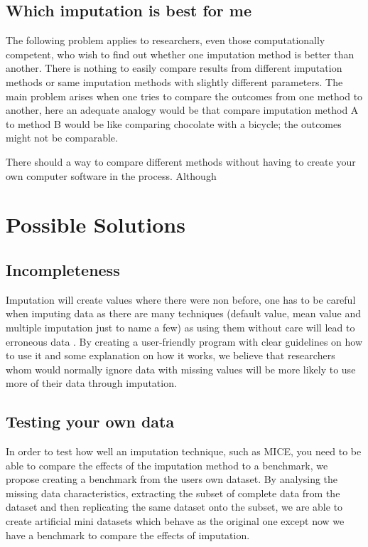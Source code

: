 \documentclass{IEEEconf}
\begin{document}
		\subsection{Which imputation is best for me} %
		\label{sub:which_imputation_is_best_for_me}
			The following problem applies to researchers, even those computationally competent, who wish to find out whether one imputation method is better than another. There is nothing to easily compare results from different imputation methods or same imputation methods with slightly different parameters. The main problem arises when one tries to compare the outcomes from one method to another, here an adequate analogy would be that compare imputation method A to method B would be like comparing chocolate with a bicycle; the outcomes might not be comparable. 

			There should a way to compare different methods without having to create your own computer software in the process. Although 

	\section{Possible Solutions} %
	\label{sec:a_solution}
		\subsection{Incompleteness} %
		\label{sub:incompleteness}
			Imputation will create values where there were non before, one has to be careful when imputing data as there are many techniques (default value, mean value and multiple imputation just to name a few) as using them without care will lead to erroneous data \cite{careful}. By creating a user-friendly program with clear guidelines on how to use it and some explanation on how it works, we believe that researchers whom would normally ignore data with missing values will be more likely to use more of their data through imputation. 
		\subsection{Testing your own data} %
		\label{sub:testing_your_own_data}
			In order to test how well an imputation technique, such as MICE, you need to be able to compare the effects of the imputation method to a benchmark, we propose creating a benchmark from the users own dataset. By analysing the missing data characteristics, extracting the subset of complete data from the dataset and then replicating the same dataset onto the subset, we are able to create artificial mini datasets which behave as the original one except now we have a benchmark to compare the effects of imputation. 
\end{document}
